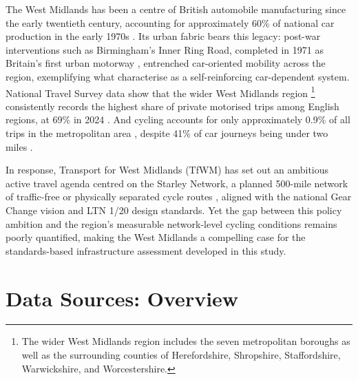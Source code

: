The West Midlands has been a centre of British automobile manufacturing since the early twentieth century, accounting for approximately 60\% of national car production in the early 1970s \parencite{donnelly2017}. Its urban fabric bears this legacy: post-war interventions such as Birmingham's Inner Ring Road, completed in 1971 as Britain's first urban motorway \parencite{gunn2018}, entrenched car-oriented mobility across the region, exemplifying what \textcite{mattioli2020} characterise as a self-reinforcing car-dependent system. National Travel Survey data show that the wider West Midlands region \footnote{The wider West Midlands region includes the seven metropolitan boroughs as well as the surrounding counties of Herefordshire, Shropshire, Staffordshire, Warwickshire, and Worcestershire.} consistently records the highest share of private motorised trips among English regions, at 69\% in 2024 \parencite{departmentfortransport2025}. And cycling accounts for only approximately 0.9\% of all trips in the metropolitan area \parencite{westmidlandscombinedauthority2024}, despite 41\% of car journeys being under two miles \parencite{westmidlandscombinedauthority2019}. 

In response, Transport for West Midlands (TfWM) has set out an ambitious active travel agenda centred on the Starley Network, a planned 500-mile network of traffic-free or physically separated cycle routes \parencite{westmidlandscombinedauthority2020}, aligned with the national Gear Change vision and LTN 1/20 design standards. Yet the gap between this policy ambition and the region's measurable network-level cycling conditions remains poorly quantified, making the West Midlands a compelling case for the standards-based infrastructure assessment developed in this study.

\section{Data Sources: Overview}
\label{sec:data}

